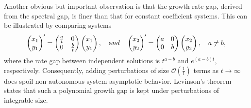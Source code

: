 \documentclass[a4paper,11pt]{article}
\newcommand{\E}{\mathcal{E}}
\theoremstyle{remark}
\begin{document}

Another obvious but important observation is that the growth rate gap, derived from the spectral gap, is finer than that for constant coefficient systems. This can be illustrated by comparing systems
\begin{align*}
\begin{pmatrix} x_1\\y_1 \end{pmatrix}' = \begin{pmatrix} \frac{a}{t} & 0\\0 & \frac{b}{t} \end{pmatrix}\begin{pmatrix} x_1\\y_1 \end{pmatrix}, 
\quad {\text and} \quad 
\begin{pmatrix} x_2\\y_2 \end{pmatrix}' = \begin{pmatrix} a & 0\\0 & b \end{pmatrix}\begin{pmatrix} x_2\\y_2 \end{pmatrix},
\quad a \ne b,
\end{align*}
where the rate gap between independent solutions is $t^{a-b}$ and $e^{(a-b)t}$, respectively. Consequently, adding perturbations of size $\mathcal{O}(\tfrac{1}{t})$ terms as $t \rightarrow \infty$ does spoil  non-autonomous system asymptotic behavior. Levinson's theorem states that such a polynomial growth gap is kept under perturbations of integrable size.
\end{document}
